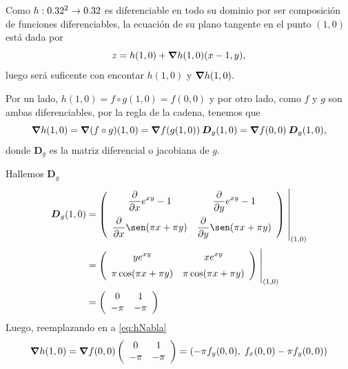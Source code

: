 \begin{solution}

    Como   $h:0.32^2\to0.32$ es diferenciable en todo su dominio por ser composición de funciones diferenciables,  la ecuaci\'on de su plano tangente en el punto $(1,0)$ est\'a dada por
    \begin{equation}
        z= h(1,0) + \grad h(1,0) (x-1,y),  \label{eq:zNabla}
    \end{equation}   luego ser\'a  suficente con encontar $ h(1,0)$ y $\grad h(1,0).$

    Por un lado,      $h(1,0)= f\circ g (1,0) =  f(0,0)$  y por otro lado,  como $f$ y $g$ son ambas diferenciables,  por la regla de la cadena,  tenemos que
    \begin{equation}
        \grad h(1,0)=\grad (f\circ g)(1,0)=\grad f(g(1,0)) \:\boldsymbol{D}_g(1,0) = \grad f (0,0) \:\boldsymbol{D}_g(1,0),  \label{eq:hNabla}
    \end{equation}    donde $\boldsymbol{D}_g$ es la matriz diferencial o  jacobiana de $g$.

    \noindent  Hallemos $\boldsymbol{D}_g$
    \begin{align*}
        \boldsymbol{D}_g(1,0) & =
        \left(\begin{array}{cc}
                      \displaystyle\partialx e^{xy}-1            & \displaystyle\partialy e^{xy}-1           \\[10pt]
                      \displaystyle\partialx  \sen (\pi x+\pi y) & \displaystyle\partialy \sen (\pi x+\pi y)
                  \end{array}\right)\left.\rule{0pt}{1.1cm}\right\rvert_{(1,0)}             \\[2pt]
                              & =\left(\begin{array}{cc}
                                               \displaystyle ye^{xy}                 & \displaystyle xe^{xy}              \\[5pt]
                                               \displaystyle   \pi\cos (\pi x+\pi y) & \displaystyle \pi\cos(\pi x+\pi y)
                                           \end{array}\right)\left.\rule{0pt}{0.7cm}\right\rvert_{(1,0)} \\[2pt]
                              & =\left(\begin{array}{cc}
                                               0    & 1    \\
                                               -\pi & -\pi
                                           \end{array}\right)
    \end{align*}
    Luego, reemplazando en  a   \eqref{eq:hNabla}
    \[
        \grad h(1,0) = \grad f(0,0)\left(\begin{array}{cc}
                0    & 1    \\
                -\pi & -\pi
            \end{array}\right) = \left(-\pi f_y(0,0),\;f_x(0,0)-\pi f_y(0,0)\right)
    \]


\end{solution}
